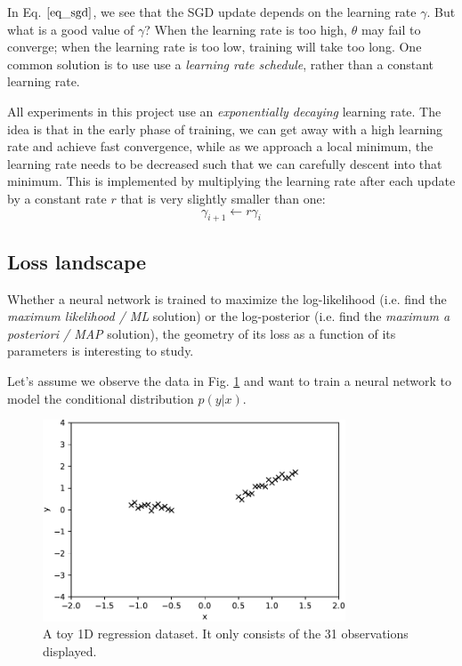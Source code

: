 \documentclass[12pt]{article}
\begin{document}
In Eq. $\ref{eq_sgd}$, we see that the SGD update depends on the learning rate $\gamma$. But what is a good value of $\gamma$? When the learning rate is too high, $\theta$ may fail to converge; when the learning rate is too low, training will take too long. One common solution is to use use a \textit{learning rate schedule}, rather than a constant learning rate.

All experiments in this project use an \textit{exponentially decaying} learning rate. The idea is that in the early phase of training, we can get away with a high learning rate and achieve fast convergence, while as we approach a local minimum, the learning rate needs to be decreased such that we can carefully descent into that minimum. This is implemented by multiplying the learning rate after each update by a constant rate $r$ that is very slightly smaller than one:
\begin{equation}
\gamma_{i+1} \leftarrow r \gamma_i
\end{equation}

\subsection{Loss landscape}
\label{sec_loss_landscape}

Whether a neural network is trained to maximize the log-likelihood (i.e. find the \textit{maximum likelihood / ML} solution) or the log-posterior (i.e. find the \textit{maximum a posteriori / MAP} solution), the geometry of its loss as a function of its parameters is interesting to study.

Let's assume we observe the data in Fig. \ref{fig_1d_dataset} and want to train a neural network to model the conditional distribution $p(y | x)$.

\begin{figure}[H]
\centering
\includegraphics[width=9cm]{plots/1d_dataset.pdf}
\caption{A toy 1D regression dataset. It only consists of the 31 observations displayed.}
\label{fig_1d_dataset}
\end{figure}
\end{document}
